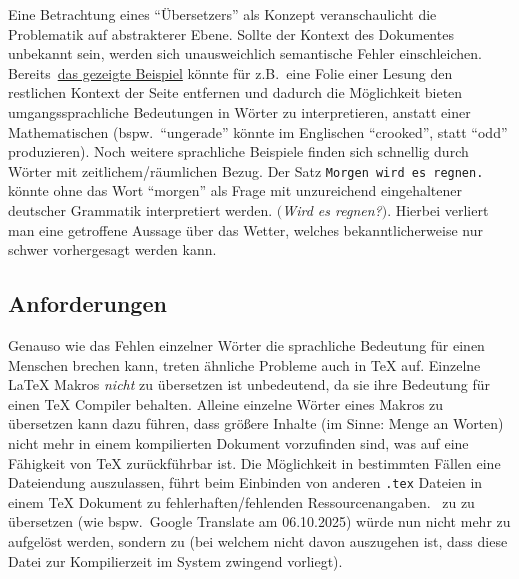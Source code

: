 Eine Betrachtung eines \enquote{Übersetzers} als Konzept veranschaulicht die Problematik auf abstrakterer Ebene. Sollte der Kontext des Dokumentes unbekannt sein, werden sich unausweichlich semantische Fehler einschleichen. Bereits~\hyperref[einleitung:hintergrund]{das gezeigte Beispiel} könnte für z.B.\ eine Folie einer Lesung den restlichen Kontext der Seite entfernen und dadurch die Möglichkeit bieten umgangssprachliche Bedeutungen in Wörter zu interpretieren, anstatt einer Mathematischen (bspw.\ \enquote{ungerade} könnte im Englischen \enquote{crooked}, statt \enquote{odd} produzieren). Noch weitere sprachliche Beispiele finden sich schnellig durch Wörter mit zeitlichem/räumlichen Bezug. Der Satz \texttt{Morgen wird es regnen.} könnte ohne das Wort \enquote{morgen} als Frage mit unzureichend eingehaltener deutscher Grammatik interpretiert werden. $($\textit{Wird es regnen?}$)$. Hierbei verliert man eine getroffene Aussage über das Wetter, welches bekanntlicherweise nur schwer vorhergesagt werden kann.%

\newpage
\subsection{Anforderungen}\label{einleitung:tex}
Genauso wie das Fehlen einzelner Wörter die sprachliche Bedeutung für einen Menschen brechen kann, treten ähnliche Probleme auch in \TeX{} auf. Einzelne \LaTeX{} Makros \textit{nicht} zu übersetzen ist unbedeutend, da sie ihre Bedeutung für einen \TeX{} Compiler behalten. Alleine einzelne Wörter eines Makros zu übersetzen kann dazu führen, dass größere Inhalte (im Sinne: Menge an Worten) nicht mehr in einem kompilierten Dokument vorzufinden sind, was auf eine Fähigkeit von \TeX{} zurückführbar ist. Die Möglichkeit in bestimmten Fällen eine Dateiendung auszulassen, führt beim Einbinden von anderen \texttt{.tex} Dateien in einem \TeX{} Dokument zu fehlerhaften/fehlenden Ressourcenangaben.\ \verb|| zu \verb|| zu übersetzen (wie bspw.\ Google Translate am 06.10.2025) würde nun nicht mehr zu \verb|| aufgelöst werden, sondern zu \verb|| (bei welchem nicht davon auszugehen ist, dass diese Datei zur Kompilierzeit im System zwingend vorliegt).\\\noindent 

